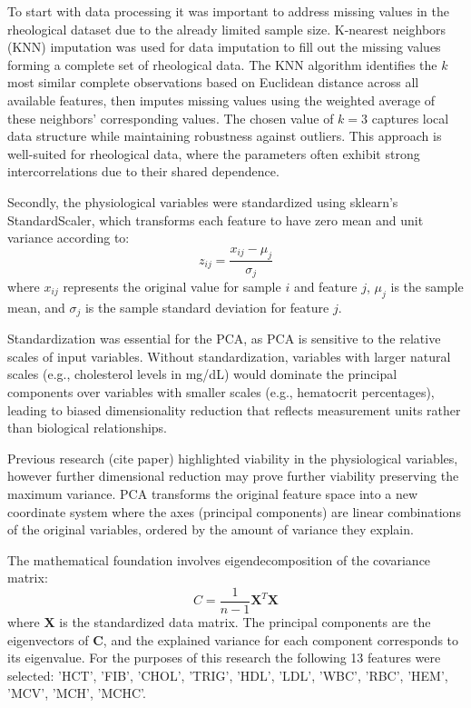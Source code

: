 \documentclass[12pt,letterpaper]{article}
\begin{document}
To start with data processing it was important to address missing values in the rheological dataset due to the already limited sample size. K-nearest neighbors (KNN)
imputation was used for data imputation to fill out the missing values forming a complete set of rheological data. The KNN algorithm identifies the $k$ most similar
complete observations based on Euclidean distance across all available features, then imputes missing values using the weighted average of these neighbors' corresponding values.
The chosen value of $k=3$ captures local data structure while maintaining robustness against outliers. This approach is well-suited for rheological data, where the parameters often
exhibit strong intercorrelations due to their shared dependence.

Secondly, the physiological variables were standardized using sklearn's StandardScaler, which transforms each feature to have zero mean and unit variance according to:
$$
    z_{ij} = \frac{x_{ij}-\mu_j}{\sigma_j}
$$
where $x_{ij}$ represents the original value for sample $i$ and feature $j$, $\mu_j$ is the sample mean, and $\sigma_j$ is the sample standard deviation for feature $j$.

Standardization was essential for the PCA, as PCA is sensitive to the relative scales of input variables. Without standardization,
variables with larger natural scales (e.g., cholesterol levels in mg/dL) would dominate the principal components over variables with smaller scales (e.g., hematocrit percentages),
leading to biased dimensionality reduction that reflects measurement units rather than biological relationships.

Previous research (cite paper) highlighted viability in the physiological variables, however further dimensional reduction may prove further viability preserving the maximum variance.
PCA transforms the original feature space into a new coordinate system where the axes (principal components) are linear combinations of the original variables,
ordered by the amount of variance they explain.

The mathematical foundation involves eigendecomposition of the covariance matrix:
$$
    C = \frac{1}{n-1} \mathbf{X}^T\mathbf{X}
$$
where $\mathbf{X}$ is the standardized data matrix. The principal components are the eigenvectors of $\mathbf{C}$, and the explained variance for each component corresponds to
its eigenvalue. For the purposes of this research the following 13 features were selected: 'HCT', 'FIB', 'CHOL', 'TRIG', 'HDL', 'LDL', 'WBC', 'RBC', 'HEM', 'MCV', 'MCH', 'MCHC'.
\end{document}
